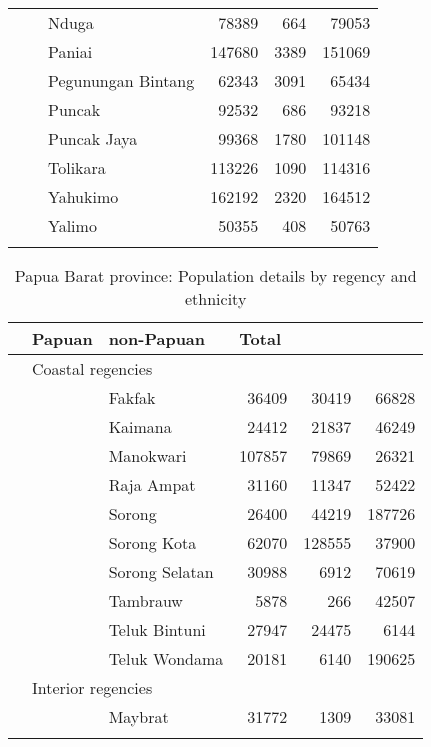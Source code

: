 \begin{table}
\begin{tabular}{lllrrr}
&  & Nduga &  78389 &  664 &  79053\\
&  & Paniai &  147680 &  3389 &  151069\\
&  & Pegunungan Bintang &  62343 &  3091 &  65434\\
&  & Puncak &  92532 &  686 &  93218\\
&  & Puncak Jaya &  99368 &  1780 &  101148\\
&  & Tolikara &  113226 &  1090 &  114316\\
&  & Yahukimo &  162192 &  2320 &  164512\\
&  & Yalimo &  50355 &  408 &  50763\\
\lspbottomrule
\end{tabular}
\end{table}

\begin{table} 
\caption{Papua Barat province: Population details by regency and ethnicity}
\label{Table_E.2a}
\begin{tabular}{lllrrr}
\lsptoprule
\multicolumn{3}{l}{Regency}  & \multicolumn{1}{l}{Papuan} & \multicolumn{1}{l}{non-Papuan} & \multicolumn{1}{l}{Total}\\ 
\midrule
\midrule
& \multicolumn{5}{l}{Coastal regencies}\\
\midrule
&  & Fakfak &  36409 &  30419 &  66828\\
&  & Kaimana &  24412 &  21837 &  46249\\
&  & Manokwari &  107857 &  79869 &  26321\\
&  & Raja Ampat &  31160 &  11347 &  52422\\
&  & Sorong &  26400 &  44219 &  187726\\
&  & Sorong Kota &  62070 &  128555 &  37900\\
&  & Sorong Selatan &  30988 &  6912 &  70619\\
&  & Tambrauw &  5878 &  266 &  42507\\
&  & Teluk Bintuni &  27947 &  24475 &  6144\\
&  & Teluk Wondama &  20181 &  6140 &  190625\\
\midrule
& \multicolumn{5}{l}{Interior regencies}\\
\midrule
&  & Maybrat &  31772 &  1309 &  33081\\
\lspbottomrule
 \end{tabular} 
\end{table} 